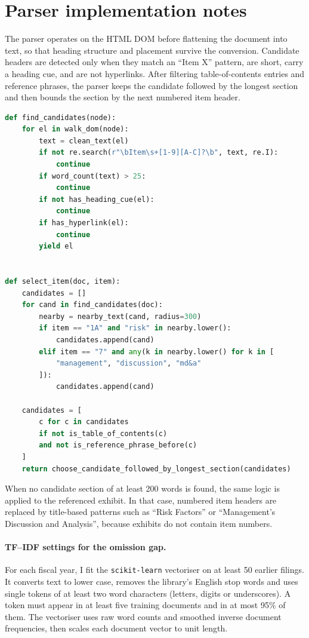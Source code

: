 \section{Parser implementation notes}
\label{sec:parser_impl}

The parser operates on the HTML DOM before flattening the document into text,
so that heading structure and placement survive the conversion. Candidate
headers are detected only when they match an ``Item X'' pattern, are short,
carry a heading cue, and are not hyperlinks. After filtering table-of-contents
entries and reference phrases, the parser keeps the candidate followed by the
longest section and then bounds the section by the next numbered item header.

\begin{lstlisting}[language=Python, basicstyle=\ttfamily\footnotesize]
def find_candidates(node):
    for el in walk_dom(node):
        text = clean_text(el)
        if not re.search(r"\bItem\s+[1-9][A-C]?\b", text, re.I):
            continue
        if word_count(text) > 25:
            continue
        if not has_heading_cue(el):
            continue
        if has_hyperlink(el):
            continue
        yield el


def select_item(doc, item):
    candidates = []
    for cand in find_candidates(doc):
        nearby = nearby_text(cand, radius=300)
        if item == "1A" and "risk" in nearby.lower():
            candidates.append(cand)
        elif item == "7" and any(k in nearby.lower() for k in [
            "management", "discussion", "md&a"
        ]):
            candidates.append(cand)

    candidates = [
        c for c in candidates
        if not is_table_of_contents(c)
        and not is_reference_phrase_before(c)
    ]
    return choose_candidate_followed_by_longest_section(candidates)
\end{lstlisting}

When no candidate section of at least 200 words is found, the same logic is
applied to the referenced exhibit. In that case, numbered item headers are
replaced by title-based patterns such as ``Risk Factors'' or ``Management's
Discussion and Analysis'', because exhibits do not contain item numbers.

\paragraph{TF--IDF settings for the omission gap.}\label{par:tfidf_settings}
For each fiscal year, I fit the \texttt{scikit-learn} vectoriser on at least 50 earlier filings. It converts text to lower case, removes the library's English stop words and uses single tokens of at least two word characters (letters, digits or underscores). A token must appear in at least five training documents and in at most 95\% of them. The vectoriser uses raw word counts and smoothed inverse document frequencies, then scales each document vector to unit length.

